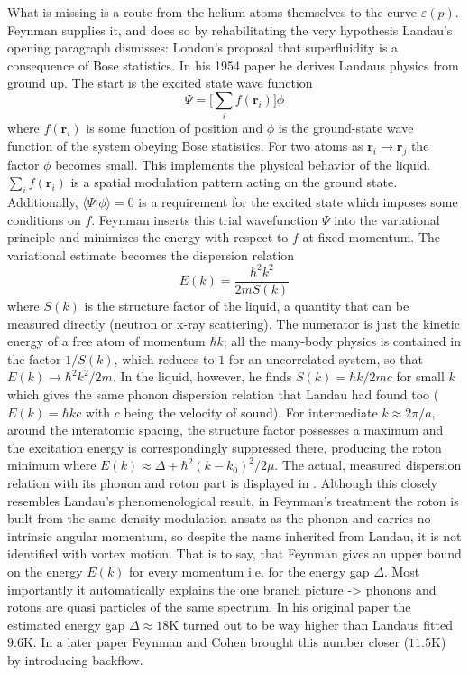 What is missing is a route from the helium atoms themselves to the curve $\varepsilon(p)$. Feynman supplies it, and does so by rehabilitating the very hypothesis Landau's opening paragraph dismisses: London's proposal that superfluidity is a consequence of Bose statistics. In his 1954 paper \cite{feynmanAtomicTheoryTwoFluid1954} he derives Landaus physics from ground up. The start is the excited state wave function
\begin{equation}
    \Psi = \big[\sum_i{f(\mathbf r_i)\big] \phi}
\end{equation}
where $f(\mathbf r_i)$ is some function of position and $\phi$ is the ground-state wave function of the system obeying Bose statistics. For two atoms as $\mathbf r_i \rightarrow \mathbf r_j$ the factor $\phi$ becomes small. This implements the physical behavior of the liquid. $\sum_i{f(\mathbf r_i)}$ is a spatial modulation pattern acting on the ground state. Additionally, $\langle\Psi | \phi\rangle = 0$ is a requirement for the excited state which imposes some conditions on $f$. Feynman inserts this trial wavefunction $\Psi$ into the variational principle and minimizes the energy with respect to $f$ at fixed momentum. The variational estimate becomes the dispersion relation
\begin{equation}
    E(k) = \frac{\hbar^2k^2}{2m S(k)}
\end{equation}
where $S(k)$ is the structure factor of the liquid, a quantity that can be measured directly (neutron or x-ray scattering).  The numerator is just the kinetic energy of a free atom of momentum $\hbar k$; all the many-body physics is contained in the factor $1/S(k)$, which reduces to $1$ for an uncorrelated system, so that $E(k) \rightarrow \hbar^2k^2/2m$. In the liquid, however, he finds $S(k) = \hbar k / 2m c$ for small $k$ which gives the same phonon dispersion relation that Landau had found too ($E(k) = \hbar k c$ with $c$ being the velocity of sound). For intermediate $k \approx 2\pi / a$, around the interatomic spacing, the structure factor possesses a maximum and the excitation energy is correspondingly suppressed there, producing the roton minimum where $E(k) \approx \Delta + \hbar^2(k-k_0)^2/2\mu$. The actual, measured dispersion relation with its phonon and roton part is displayed in . Although this closely resembles Landau's phenomenological result, in Feynman's treatment the roton is built from the same density-modulation ansatz as the phonon and carries no intrinsic angular momentum, so despite the name inherited from Landau, it is not identified with vortex motion. That is to say, that Feynman gives an upper bound on the energy $E(k)$ for every momentum i.e. for the energy gap $\Delta$. Most importantly it automatically explains the one branch picture -> phonons and rotons are quasi particles of the same spectrum. In his original paper the estimated energy gap $\Delta \approx 18 \mathrm{K}$ turned out to be way higher than Landaus fitted $9.6\mathrm{K}$. In a later paper \cite{feynmanEnergySpectrumExcitations1956} Feynman and Cohen brought this number closer ($11.5 \mathrm{K}$) by introducing backflow.

